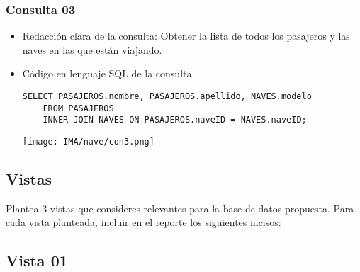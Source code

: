 \subsubsection*{Consulta 03}

\begin{itemize}
    \item Redacción clara de la consulta: Obtener la lista de todos los pasajeros y las naves en las que están viajando.
    \item Código en lenguaje SQL de la consulta.
    
    \begin{lstlisting}[caption={Tablas para la BdDatos}, label={lst:sql_estadios}]
    SELECT PASAJEROS.nombre, PASAJEROS.apellido, NAVES.modelo
    FROM PASAJEROS
    INNER JOIN NAVES ON PASAJEROS.naveID = NAVES.naveID;
    \end{lstlisting}    

    \begin{center}
      \texttt{[image: IMA/nave/con3.png]}
    \end{center}
    
\end{itemize}


\subsection{Vistas}

Plantea 3 vistas que consideres relevantes para la base de datos propuesta. Para cada vista planteada, incluir en el reporte los siguientes incisos:

\subsection*{Vista 01}

